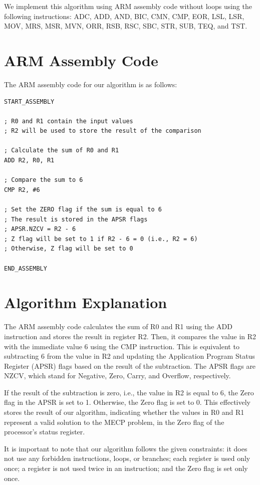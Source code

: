 \begin{enumerate}
We implement this algorithm using ARM assembly code without loops using the following instructions: ADC, ADD, AND, BIC, CMN, CMP, EOR, LSL, LSR, MOV, MRS, MSR, MVN, ORR, RSB, RSC, SBC, STR, SUB, TEQ, and TST.

\section{ARM Assembly Code}

The ARM assembly code for our algorithm is as follows:

\begin{verbatim}
START_ASSEMBLY

; R0 and R1 contain the input values
; R2 will be used to store the result of the comparison

; Calculate the sum of R0 and R1
ADD R2, R0, R1

; Compare the sum to 6
CMP R2, #6

; Set the ZERO flag if the sum is equal to 6
; The result is stored in the APSR flags
; APSR.NZCV = R2 - 6
; Z flag will be set to 1 if R2 - 6 = 0 (i.e., R2 = 6)
; Otherwise, Z flag will be set to 0

END_ASSEMBLY
\end{verbatim}

\section{Algorithm Explanation}

The ARM assembly code calculates the sum of R0 and R1 using the ADD instruction and stores the result in register R2. Then, it compares the value in R2 with the immediate value 6 using the CMP instruction. This is equivalent to subtracting 6 from the value in R2 and updating the Application Program Status Register (APSR) flags based on the result of the subtraction. The APSR flags are NZCV, which stand for Negative, Zero, Carry, and Overflow, respectively.

If the result of the subtraction is zero, i.e., the value in R2 is equal to 6, the Zero flag in the APSR is set to 1. Otherwise, the Zero flag is set to 0. This effectively stores the result of our algorithm, indicating whether the values in R0 and R1 represent a valid solution to the MECP problem, in the Zero flag of the processor's status register.

It is important to note that our algorithm follows the given constraints: it does not use any forbidden instructions, loops, or branches; each register is used only once; a register is not used twice in an instruction; and the Zero flag is set only once.


\end{enumerate}
